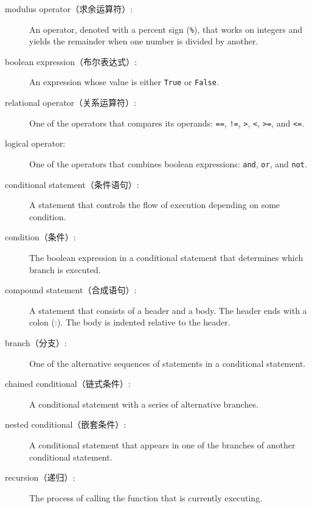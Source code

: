 \documentclass[10pt]{book}
\begin{document}
\begin{CJK}{UTF8}{gbsn}
\begin{description}
\item[modulus operator（求余运算符）:]  An operator, denoted with a percent sign
({\tt \%}), that works on integers and yields the remainder when one
number is divided by another.

\item[boolean expression（布尔表达式）:]  An expression whose value is either 
{\tt True} or {\tt False}.

\item[relational operator（关系运算符）:] One of the operators that compares
its operands: {\tt ==}, {\tt !=}, {\tt >}, {\tt <}, {\tt >=}, and {\tt <=}.

\item[logical operator:] One of the operators that combines boolean
expressions: {\tt and}, {\tt or}, and {\tt not}.

\item[conditional statement（条件语句）:]  A statement that controls the flow of
execution depending on some condition.

\item[condition（条件）:] The boolean expression in a conditional statement
that determines which branch is executed.

\item[compound statement（合成语句）:]  A statement that consists of a header
and a body.  The header ends with a colon (:).  The body is indented
relative to the header.

\item[branch（分支）:] One of the alternative sequences of statements in
a conditional statement.

\item[chained conditional（链式条件）:]  A conditional statement with a series
of alternative branches.

\item[nested conditional（嵌套条件）:]  A conditional statement that appears
in one of the branches of another conditional statement.

\item[recursion（递归）:]  The process of calling the function that is
currently executing.


\end{description}
\end{CJK}
\end{document}
